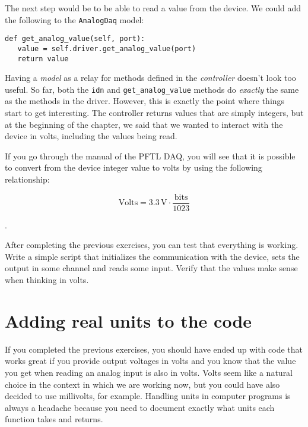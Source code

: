 The next step would be to be able to read a value from the device. We could add the following to the \texttt{AnalogDaq} model:

\begin{verbatim}
def get_analog_value(self, port):
   value = self.driver.get_analog_value(port)
   return value
\end{verbatim}

Having a \emph{model} as a relay for methods defined in the \emph{controller} doesn't look too useful. So far, both the \texttt{idn} and \texttt{get\_analog\_value} methods do \emph{exactly} the same as the methods in the driver. However, this is exactly the point where things start to get interesting. The controller returns values that are simply integers, but at the beginning of the chapter, we said that we wanted to interact with the device in volts, including the values being read. 

If you go through the manual of the {PFTL DAQ}, you will see that it is possible to convert from the device integer value to volts by using the following relationship:

\begin{equation}
 \textrm{Volts} = 3.3\,\textrm{V} \cdot \frac{\textrm{bits}}{1023}
\end{equation}


. 

After completing the previous exercises, you can test that everything is working. Write a simple script that initializes the communication with the device, sets the output in some channel and reads some input. Verify that the values make sense when thinking in volts. 

\section{Adding real units to the code}\label{adding-units-to-thecode}
If you completed the previous exercises, you should have ended up with code that works great if you provide output voltages in volts and you know that the value you get when reading an analog input is also in volts. Volts seem like a natural choice in the context in which we are working now, but you could have also decided to use millivolts, for example. Handling units in computer programs is always a headache because you need to document exactly what units each function takes and returns. 

